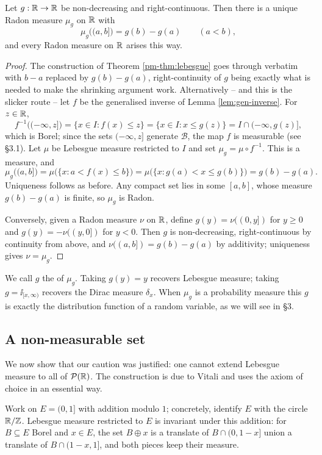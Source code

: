 \documentclass[a4paper]{scrartcl}
\newcommand{\cB}{\mathcal{B}}
\newcommand{\ind}{\ii}
\begin{document}
\begin{theorem}\label{thm:stieltjes}
	Let $g : \mathbb{R} \to \mathbb{R}$ be non-decreasing and right-continuous. Then there is a unique Radon measure $\mu_g$ on $\mathbb{R}$ with
	$$
	\mu_g\big((a,b]\big) = g(b) - g(a) \qquad (a<b),
	$$
	and every Radon measure on $\mathbb{R}$ arises this way.
\end{theorem}
\begin{proof}
	The construction of Theorem \ref{pm-thm:lebesgue} goes through verbatim with $b - a$ replaced by $g(b)-g(a)$, right-continuity of $g$ being exactly what is needed to make the shrinking argument work. Alternatively -- and this is the slicker route -- let $f$ be the generalised inverse of Lemma \ref{lem:gen-inverse}. For $z \in \mathbb{R}$,
	$$
	f^{-1}\big((-\infty, z]\big) = \{x \in I : f(x)\leq z\} = \{x \in I : x \leq g(z)\} = I \cap (-\infty, g(z)],
	$$
	which is Borel; since the sets $(-\infty,z]$ generate $\cB$, the map $f$ is measurable (see \S3.1). Let $\mu$ be Lebesgue measure restricted to $I$ and set $\mu_g = \mu \circ f^{-1}$. This is a measure, and
	$$
	\mu_g\big((a,b]\big) = \mu\big(\{x : a < f(x) \leq b\}\big) = \mu\big(\{x : g(a) < x \leq g(b)\}\big) = g(b)-g(a).
	$$
	Uniqueness follows as before. Any compact set lies in some $[a,b]$, whose measure $g(b)-g(a)$ is finite, so $\mu_g$ is Radon.

	Conversely, given a Radon measure $\nu$ on $\mathbb{R}$, define $g(y) = \nu((0,y])$ for $y \geq 0$ and $g(y) = -\nu((y,0])$ for $y<0$. Then $g$ is non-decreasing, right-continuous by continuity from above, and $\nu((a,b]) = g(b)-g(a)$ by additivity; uniqueness gives $\nu = \mu_g$.
\end{proof}

We call $g$ the  of $\mu_g$. Taking $g(y)=y$ recovers Lebesgue measure; taking $g = \ind_{[x,\infty)}$ recovers the Dirac measure $\delta_x$. When $\mu_g$ is a probability measure this $g$ is exactly the distribution function of a random variable, as we will see in \S3.

\subsection{A non-measurable set}

We now show that our caution was justified: one cannot extend Lebesgue measure to all of $\mathcal{P}(\mathbb{R})$. The construction is due to Vitali and uses the axiom of choice in an essential way.

Work on $E = (0,1]$ with addition modulo $1$; concretely, identify $E$ with the circle $\mathbb{R}/\mathbb{Z}$. Lebesgue measure restricted to $E$ is invariant under this addition: for $B \subseteq E$ Borel and $x \in E$, the set $B \oplus x$ is a translate of $B \cap (0, 1-x]$ union a translate of $B \cap (1-x, 1]$, and both pieces keep their measure.
\end{document}
